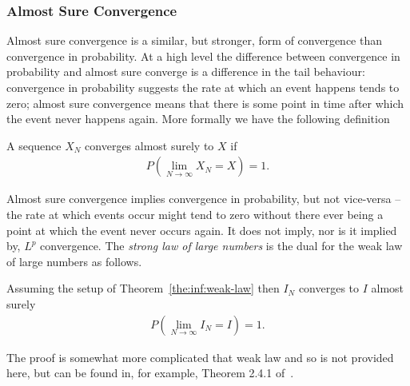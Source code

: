 \subsubsection{Almost Sure Convergence}
\label{sec:inf:mc:conv:as}

Almost sure convergence is a similar, but stronger, form of convergence than convergence in
probability.  At a high level the difference between
convergence in probability and almost sure converge is a difference in the tail behaviour:
convergence in probability suggests the rate at which an event happens tends to zero; almost
sure convergence means that there is some point in time after which the event never happens
again.  More formally we have the following definition
\begin{definition}
A sequence $X_N$ converges almost surely to $X$ if
\begin{align}
	P\left(\lim\limits_{N\rightarrow\infty} X_N=X\right)=1.
\end{align}
\end{definition}
Almost sure convergence implies convergence in probability, but not vice-versa -- the rate
at which events occur might tend to zero without there ever being a point at which the
event never occurs again.  It does not imply, nor is it implied by, $L^p$ convergence.
The \emph{strong law of large numbers} is the dual for the weak law of large numbers as
follows.
\begin{theorem}
	Assuming the setup of Theorem~\ref{the:inf:weak-law} then $I_N$ converges to $I$ almost surely
	\begin{align}
	P\left(\lim\limits_{N\rightarrow\infty} I_N=I\right)=1.
	\end{align}
\end{theorem}
The proof is somewhat more complicated that weak law and so is not provided here, but can
be found in, for example, Theorem 2.4.1 of~\cite{durrett2010probability}.